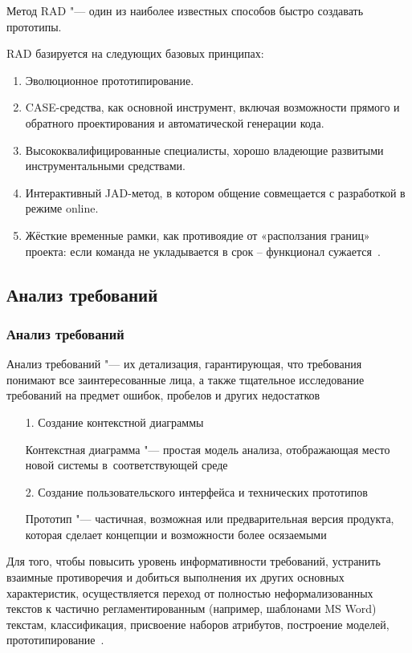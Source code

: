 \documentclass{../industrial-development}
\begin{document}
Метод RAD "--- один из наиболее известных способов быстро создавать прототипы.

RAD базируется на следующих базовых принципах:
\begin{enumerate}
\item Эволюционное прототипирование.
\item CASE-средства, как основной инструмент, включая возможности прямого и
обратного проектирования и автоматической генерации кода.
\item Высококвалифицированные специалисты, хорошо владеющие развитыми
инструментальными средствами.
\item Интерактивный JAD-метод, в котором общение совмещается с разработкой
в режиме online.
\item Жёсткие временные рамки, как противоядие от «расползания границ» проекта: если команда не укладывается в срок – функционал сужается~\cite[с.~33--34]{Maglinec}.
\end{enumerate}


\subsection{Анализ требований}
\begin{frame} \frametitle{Анализ требований}
  \begin{block}{}
   \alert{Анализ требований} "--- их детализация, гарантирующая, что требования понимают все заинтересованные лица, а также тщательное исследование требований на предмет ошибок, пробелов и других недостатков
  \end{block}
	
\begin{itemize}
\item[1.] Создание контекстной диаграммы

{\small Контекстная диаграмма "--- простая модель анализа, отображающая место новой системы в~соответствующей среде}

\item[2.] Создание пользовательского интерфейса и технических прототипов

{\small Прототип "--- частичная, возможная или предварительная версия продукта, которая сделает концепции и возможности более осязаемыми}

\end{itemize}
\end{frame}

\lecturenotes

Для того, чтобы повысить уровень информативности требований, устранить взаимные противоречия и добиться выполнения их других основных характеристик, осуществляется переход от полностью неформализованных текстов к частично регламентированным (например, шаблонами MS Word) текстам, классификация, присвоение наборов атрибутов, построение моделей, прототипирование~\cite[с.~40]{Maglinec}.
\end{document}
